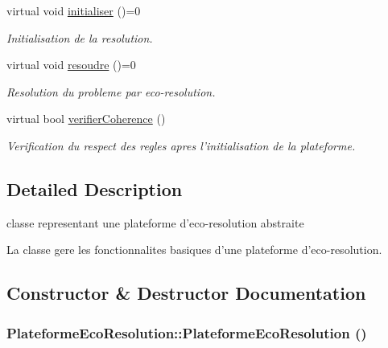 \begin{CompactItemize}
virtual void \hyperlink{classPlateformeEcoResolution_57d87139f09ca51cd6a4fa7cd2e83351}{initialiser} ()=0
\begin{CompactList}\small\item\em Initialisation de la resolution. \item\end{CompactList}\item 
virtual void \hyperlink{classPlateformeEcoResolution_17f587580cd8aee537551bc0ddd82bef}{resoudre} ()=0
\begin{CompactList}\small\item\em Resolution du probleme par eco-resolution. \item\end{CompactList}\item 
virtual bool \hyperlink{classPlateformeEcoResolution_4b7bc97302e1845f2b972499e1faf8b4}{verifierCoherence} ()
\begin{CompactList}\small\item\em Verification du respect des regles apres l'initialisation de la plateforme. \item\end{CompactList}\end{CompactItemize}


\subsection{Detailed Description}
classe representant une plateforme d'eco-resolution abstraite 

La classe gere les fonctionnalites basiques d'une plateforme d'eco-resolution. 

\subsection{Constructor \& Destructor Documentation}
\hypertarget{classPlateformeEcoResolution_6e03cc2c6a51bc4a47d2d226e41d13e9}{
\subsubsection[{PlateformeEcoResolution}]{\setlength{\rightskip}{0pt plus 5cm}PlateformeEcoResolution::PlateformeEcoResolution ()}}
\label{classPlateformeEcoResolution_6e03cc2c6a51bc4a47d2d226e41d13e9}


